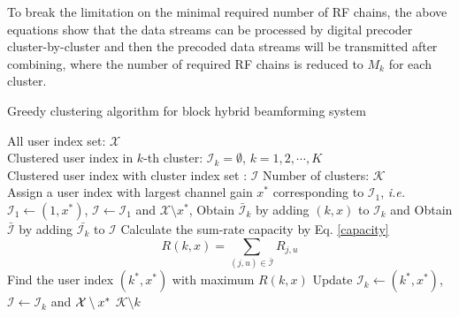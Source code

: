 \documentclass[conference]{IEEEtran}
\begin{document}
{ To break the limitation on the minimal required number of RF chains, the above equations show that the data streams can be processed by digital precoder cluster-by-cluster and then the precoded data streams will be transmitted after combining, where the number of required RF chains is reduced to $M_k$ for each cluster.
\begin{algorithm}[h] 		
	\caption{Greedy clustering algorithm for block hybrid beamforming system}
	\label{beam_cluster}
	\begin{algorithmic}[1]
		\REQUIRE  \quad
		\STATE	All user index set: $\mathcal{X}$\\
		\STATE  Clustered user index in $k$-th cluster: $\mathcal{I}_k=\emptyset$, $k=1,2,\cdots, K$\\
		\STATE 	Clustered user index with cluster index set : $\bm{\mathcal{I}}$
		\STATE  Number of clusters: $\mathcal{K}$\\
		\ENSURE   	
		\STATE Assign a user index with largest channel gain $x^*$ corresponding to ${\mathcal I}_1$, {\em i.e.} $\mathcal{I}_1 \leftarrow  (1, x^*)$,  $\bm{\mathcal{I}} \leftarrow \mathcal{I}_1$ and ${\mathcal X}\setminus x^*$,
		\STATE  Obtain $\bar{{\mathcal{I}}}_k$ by adding $(k,x)$ to $\mathcal{I}_k$ and 
		\STATE  Obtain $\bar{\bm{\mathcal{I}}}$ by adding $\bar{\mathcal{I}_k}$ to ${\bm{\mathcal{I}}}$
		\STATE Calculate the sum-rate capacity by Eq. \eqref{capacity} $$R(k,x)= \sum_{(j,u)\in \bar{\bm{\mathcal{I}}}} R_{j,u}$$
		\ENDFOR
		\STATE Find the user index $(k^*,x^*)$ with maximum $R(k,x)$
		\STATE Update $\mathcal{I}_{k}\leftarrow (k^*, x^*)$, $\bm{\mathcal{I}}\leftarrow \mathcal{I}_k$ and  ${\cal X}\setminus x^*$
		\ENDFOR
		\STATE ${\mathcal{K}} \setminus k$
		\ENDIF
		\ENDWHILE
	\end{algorithmic}
\end{algorithm}


}
\end{document}
